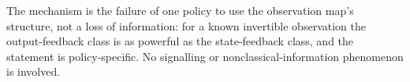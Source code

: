 The mechanism is the failure of one policy to use the observation map's structure, not a loss of information: for a known invertible observation the output-feedback class is as powerful as the state-feedback class, and the statement is policy-specific. No signalling or nonclassical-information phenomenon \citep{witsenhausen1968} is involved.
